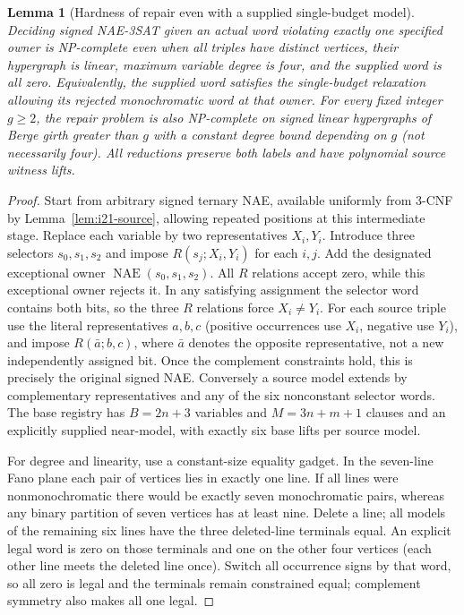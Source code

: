 \documentclass[11pt]{article}
\newtheorem{lemma}[theorem]{Lemma}
\begin{document}
\begin{lemma}[Hardness of repair even with a supplied single-budget model]\label{lem:bh15-repair}
Deciding signed NAE-3SAT given an actual word violating exactly one specified owner is NP-complete even when all triples have distinct vertices, their hypergraph is linear, maximum variable degree is four, and the supplied word is all zero. Equivalently, the supplied word satisfies the single-budget relaxation allowing its rejected monochromatic word at that owner. For every fixed integer $g\ge2$, the repair problem is also NP-complete on signed linear hypergraphs of Berge girth greater than $g$ with a constant degree bound depending on $g$ (not necessarily four). All reductions preserve both labels and have polynomial source witness lifts.
\end{lemma}
\begin{proof}
Start from arbitrary signed ternary NAE, available uniformly from 3-CNF by Lemma~\ref{lem:i21-source}, allowing repeated positions at this intermediate stage. Replace each variable by two representatives $X_i,Y_i$. Introduce three selectors $s_0,s_1,s_2$ and impose $R(s_j;X_i,Y_i)$ for each $i,j$. Add the designated exceptional owner $\operatorname{NAE}(s_0,s_1,s_2)$. All $R$ relations accept zero, while this exceptional owner rejects it. In any satisfying assignment the selector word contains both bits, so the three $R$ relations force $X_i\ne Y_i$. For each source triple use the literal representatives $a,b,c$ (positive occurrences use $X_i$, negative use $Y_i$), and impose $R(\bar a;b,c)$, where $\bar a$ denotes the opposite representative, not a new independently assigned bit. Once the complement constraints hold, this is precisely the original signed NAE. Conversely a source model extends by complementary representatives and any of the six nonconstant selector words. The base registry has $B=2n+3$ variables and $M=3n+m+1$ clauses and an explicitly supplied near-model, with exactly six base lifts per source model.

For degree and linearity, use a constant-size equality gadget. In the seven-line Fano plane each pair of vertices lies in exactly one line. If all lines were nonmonochromatic there would be exactly seven monochromatic pairs, whereas any binary partition of seven vertices has at least nine. Delete a line; all models of the remaining six lines have the three deleted-line terminals equal. An explicit legal word is zero on those terminals and one on the other four vertices (each other line meets the deleted line once). Switch all occurrence signs by that word, so all zero is legal and the terminals remain constrained equal; complement symmetry also makes all one legal.


\end{proof}
\end{document}
